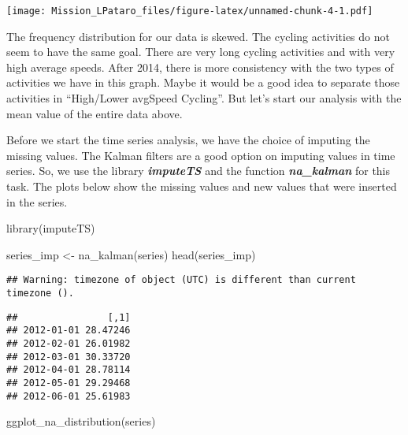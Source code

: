 \documentclass[
]{article}
\newenvironment{Shaded}{\begin{snugshade}}{\end{snugshade}}
\newcommand{\FunctionTok}[1]{\textcolor[rgb]{0.00,0.00,0.00}{#1}}
\newcommand{\NormalTok}[1]{#1}
\newcommand{\OtherTok}[1]{\textcolor[rgb]{0.56,0.35,0.01}{#1}}
\begin{document}
\texttt{[image: Mission\_LPataro\_files/figure-latex/unnamed-chunk-4-1.pdf]}

The frequency distribution for our data is skewed. The cycling
activities do not seem to have the same goal. There are very long
cycling activities and with very high average speeds. After 2014, there
is more consistency with the two types of activities we have in this
graph. Maybe it would be a good idea to separate those activities in
``High/Lower avgSpeed Cycling''. But let's start our analysis with the
mean value of the entire data above.

Before we start the time series analysis, we have the choice of imputing
the missing values. The Kalman filters are a good option on imputing
values in time series. So, we use the library \textbf{\emph{imputeTS}}
and the function \textbf{\emph{na\_kalman}} for this task. The plots
below show the missing values and new values that were inserted in the
series.

\begin{Shaded}
\begin{Highlighting}[]
\FunctionTok{library}\NormalTok{(imputeTS)}
\end{Highlighting}
\end{Shaded}

\begin{Shaded}
\begin{Highlighting}[]
\NormalTok{series\_imp }\OtherTok{\textless{}{-}} \FunctionTok{na\_kalman}\NormalTok{(series)}
\FunctionTok{head}\NormalTok{(series\_imp)}
\end{Highlighting}
\end{Shaded}

\begin{verbatim}
## Warning: timezone of object (UTC) is different than current timezone ().
\end{verbatim}

\begin{verbatim}
##                [,1]
## 2012-01-01 28.47246
## 2012-02-01 26.01982
## 2012-03-01 30.33720
## 2012-04-01 28.78114
## 2012-05-01 29.29468
## 2012-06-01 25.61983
\end{verbatim}

\begin{Shaded}
\begin{Highlighting}[]
\FunctionTok{ggplot\_na\_distribution}\NormalTok{(series)}
\end{Highlighting}
\end{Shaded}
\end{document}
